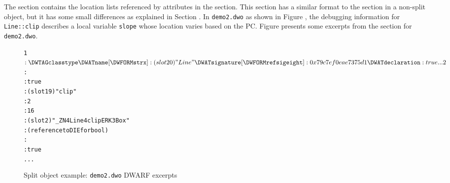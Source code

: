 The \dotdebuglocdwo{} section contains the location lists referenced
by \DWATlocation{} attributes in the \dotdebuginfodwo{} section. This
section has a similar format to the \dotdebugloc{} section in a
non-split object, but it has some small differences as explained
in Section . 
In \texttt{demo2.dwo} as shown in 
Figure , 
the debugging information for \texttt{Line::clip} describes a local 
variable \texttt{slope} whose location varies based on the PC.
Figure  
presents some excerpts from the \dotdebuginfodwo{} section for 
\texttt{demo2.dwo}.

\begin{figure}[b]
\begin{dwflisting}
\begin{alltt}

1$: \DWTAGclasstype
        \DWATname [\DWFORMstrx]: (slot 20) "Line"
        \DWATsignature [\DWFORMrefsigeight]: 0x79c7ef0eae7375d1
        \DWATdeclaration: true
    ...
2$:   \DWTAGsubprogram
          \DWATexternal: true
          \DWATname [\DWFORMstrx]: (slot 19) "clip"
          \DWATdeclfile: 2
          \DWATdeclline: 16
          \DWATlinkagename [\DWFORMstrx]: (slot 2) "_ZN4Line4clipERK3Box"
          \DWATtype: (reference to DIE for bool)
          \DWATaccessibility: \DWACCESSpublic
          \DWATdeclaration: true
      ...
\end{alltt}
\end{dwflisting}
\caption{Split object example: \texttt{demo2.dwo} DWARF \dotdebuginfodwo{} excerpts}
\label{fig:splitobjectexampledemotwodwodwarfdebuginfodwoexcerpts}
\end{figure}

